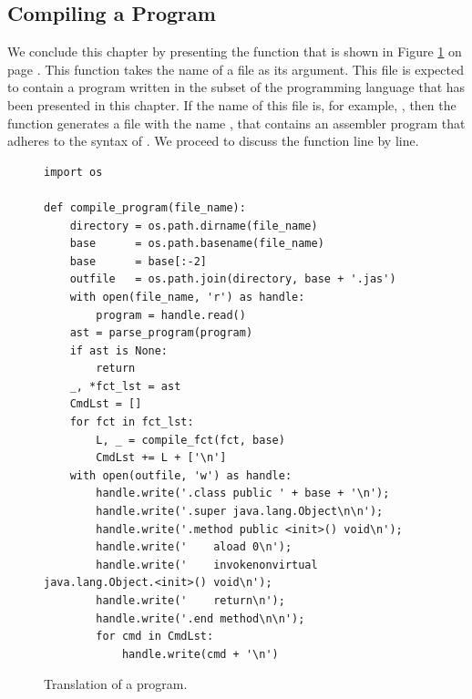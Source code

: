 \subsection{Compiling a Program}
We conclude this chapter by presenting the function  that is shown in Figure
\ref{fig:Compiler.ipynb:compile_program} on page \pageref{fig:Compiler.ipynb:compile_program}. This function
takes the name of a file as its argument.  This file is expected to contain a program written in the subset
of the programming language  that has been presented in this chapter.  If the name of this file is, for example,
, then the function  generates a file with the name ,
that contains an assembler program that adheres to the syntax of . We proceed to discuss the
function  line by line. 

\begin{figure}[!ht]
\centering
\begin{verbatim}
import os

def compile_program(file_name):
    directory = os.path.dirname(file_name)
    base      = os.path.basename(file_name)
    base      = base[:-2]
    outfile   = os.path.join(directory, base + '.jas')
    with open(file_name, 'r') as handle:
        program = handle.read()
    ast = parse_program(program)
    if ast is None:
        return
    _, *fct_lst = ast
    CmdLst = []
    for fct in fct_lst:
        L, _ = compile_fct(fct, base)
        CmdLst += L + ['\n']
    with open(outfile, 'w') as handle:
        handle.write('.class public ' + base + '\n');
        handle.write('.super java.lang.Object\n\n');
        handle.write('.method public <init>() void\n');
        handle.write('    aload 0\n');
        handle.write('    invokenonvirtual java.lang.Object.<init>() void\n');
        handle.write('    return\n');
        handle.write('.end method\n\n');
        for cmd in CmdLst:
            handle.write(cmd + '\n')
\end{verbatim}
\vspace*{-0.3cm}
\caption{Translation of a program.}
\label{fig:Compiler.ipynb:compile_program}
\end{figure}

